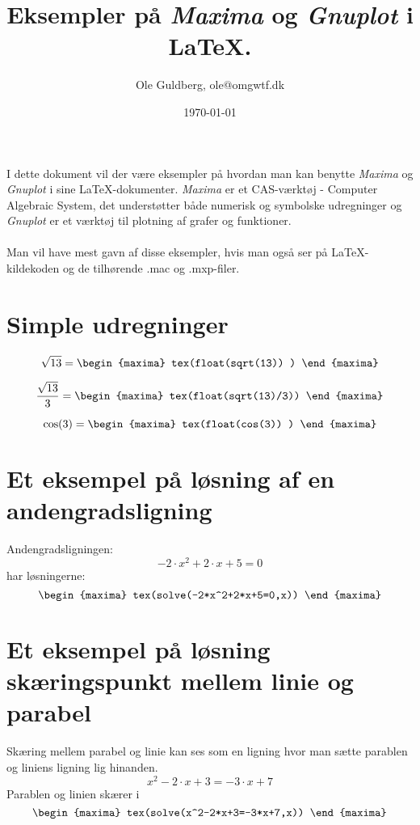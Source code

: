 \documentclass[12pt,a4paper]{article}
\def\Maxima{\emph{Maxima}}
\def\Gnuplot{\emph{Gnuplot}}
\begin{document}
\title{Eksempler på \Maxima{} og \Gnuplot{} i \LaTeX{}.}
\author{Ole Guldberg, ole@omgwtf.dk}
\date{\today}
\maketitle

I dette dokument vil der være eksempler på hvordan man kan benytte \Maxima{} og \Gnuplot{} i sine \LaTeX{}-dokumenter. 
\Maxima{} er et CAS-værktøj - Computer Algebraic System, det understøtter både numerisk og symbolske udregninger og \Gnuplot{} er et værktøj til plotning af grafer og funktioner. 
\\ \\
Man vil have mest gavn af disse eksempler, hvis man også ser på \LaTeX{}-kildekoden og de tilhørende .mac og .mxp-filer.

\section*{Simple udregninger}

$$\sqrt{13} = 
\begin{maxima}
  tex(float(sqrt(13)) )
\end{maxima}$$

$$\frac{\sqrt{13}}{3}=
\begin{maxima}
  tex(float(sqrt(13)/3))
\end{maxima}$$

$$\cos(3) = 
\begin{maxima}
  tex(float(cos(3)) )
\end{maxima}$$

\section*{Et eksempel på løsning af en andengradsligning}

Andengradsligningen: $$-2 \cdot x^2+2 \cdot x+5 = 0$$ har løsningerne:
$$\begin{maxima}
  tex(solve(-2*x^2+2*x+5=0,x))
\end{maxima}
$$

\section*{Et eksempel på løsning skæringspunkt mellem linie og parabel}

Skæring mellem parabel og linie kan ses som en ligning hvor man sætte parablen og liniens ligning lig hinanden.
$$x^2 - 2 \cdot x + 3 = - 3 \cdot x +7$$
Parablen og linien skærer i
$$\begin{maxima}
  tex(solve(x^2-2*x+3=-3*x+7,x))
\end{maxima}$$
\end{document}
